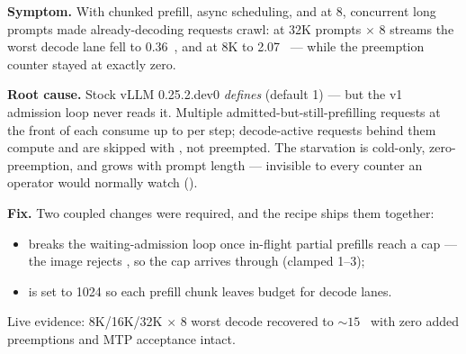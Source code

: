 \textbf{Symptom.} With chunked prefill, async scheduling, and
 at 8, concurrent long prompts made already-decoding
requests crawl: at 32K prompts $\times$ 8 streams the worst decode lane fell to
0.36~\tokspersec{}, and at 8K to 2.07~\tokspersec{} --- while the preemption
counter stayed at exactly zero.

\textbf{Root cause.} Stock vLLM 0.25.2.dev0 \emph{defines}
 (default 1) --- but the v1
 admission loop never reads it. Multiple
admitted-but-still-prefilling requests at the front of  each
consume up to  per step; decode-active requests
behind them compute  and are skipped with
, not preempted. The starvation is cold-only, zero-preemption,
and grows with prompt length --- invisible to every counter an operator would
normally watch ().

\textbf{Fix.} Two coupled changes were required, and the recipe ships them
together:
\begin{itemize}
  \item {}
    breaks the waiting-admission loop once in-flight partial prefills reach a
    cap --- the image rejects , so the cap
    arrives through  (clamped 1--3);
  \item {} is set to 1024 so each
    prefill chunk leaves budget for decode lanes.
\end{itemize}
Live evidence: 8K/16K/32K $\times$ 8 worst decode recovered to
${\sim}15$~\tokspersec{} with zero added preemptions and MTP acceptance
intact.

